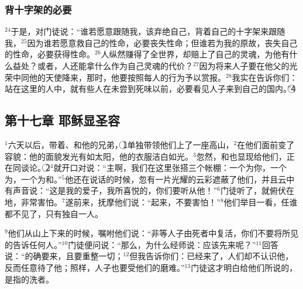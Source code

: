\subsubsection{背十字架的必要}
$^{24}$于是，\UL[耶稣]对门徒说：“谁若愿意跟随我，该弃绝自己，背着自己的十字架来跟随我，$^{25}$因为谁若愿意救自己的性命，必要丧失性命；但谁若为我的原故，丧失自己的性命，必要获得性命。$^{26}$人纵然赚得了全世界，却赔上了自己的灵魂，为他有什么益处？或者，人还能拿什么作为自己灵魂的代价？$^{27}$因为将来人子要在他父的光荣中同他的天使降来，那时，他要按照每人的行为予以赏报。$^{28}$我实在告诉你们：站在这里的人中，就有些人在未尝到死味以前，必要看见人子来到自己的国内。”\textcircled{4}


\subsection{第十七章 耶稣显圣容}
$^{1}$六天以后，\UL[耶稣]带着\UL[伯多禄]、\UL[雅各伯]和他的兄弟\UL[若望]，\textcircled{1}单独带领他们上了一座高山，$^{2}$在他们面前变了容貌：他的面貌发光有如太阳，他的衣服洁白如光。$^{3}$忽然，\UL[梅瑟]和\UL[厄里亚]也显现给他们，正在同\UL[耶稣]谈论。\textcircled{2}$^{4}$\UL[伯多禄]就开口对\UL[耶稣]说：“主啊，我们在这里张搭三个帐棚：一个为你，一个为\UL[梅瑟]，一个为和\UL[厄里亚]。”$^{5}$他还在说话的时候，忽有一片光耀的云彩遮蔽了他们，并且云中有声音说：“这是我的爱子，我所喜悦的，你们要听从他！”$^{6}$门徒听了，就俯伏在地，非常害怕。$^{7}$\UL[耶稣]遂前来，抚摩他们说：“起来，不要害怕！”$^{8}$他们举目一看，任谁都不见了，只有\UL[耶稣]独自一人。


$^{9}$他们从山上下来的时候，\UL[耶稣]嘱咐他们说：“非等人子由死者中复活，你们不要将所见的告诉任何人。”$^{10}$门徒便问\UL[耶稣]说：“那么，为什么经师说：\UL[厄里亚]应该先来呢？”$^{11}$\UL[耶稣]回答说：“\UL[厄里亚]的确要来，且要重整一切；$^{12}$但我告诉你们：\UL[厄里亚]已经来了，人们却不认识他，反而任意待了他；照样，人子也要受他们的磨难。”$^{13}$门徒这才明白\UL[耶稣]给他们所说的，是指的洗者\UL[若翰]。


